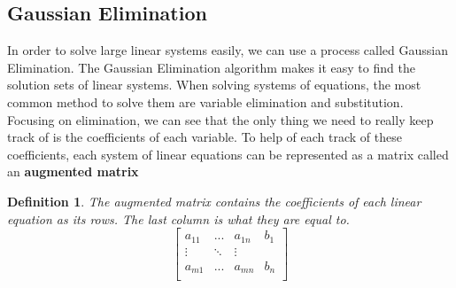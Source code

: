\documentclass{article}
\newtheorem{definition}{Definition}
\begin{document}
    \subsection{Gaussian Elimination}
    In order to solve large linear systems easily, we can use a process called Gaussian Elimination. The Gaussian Elimination algorithm makes it easy to find the solution sets of linear systems.
    When solving systems of equations, the most common method to solve them are variable elimination and substitution.
    Focusing on elimination, we can see that the only thing we need to really keep track of is the coefficients of each variable.
    To help of each track of these coefficients, each system of linear equations can be represented as a matrix called an \textbf{augmented matrix}
    \begin{definition}
        The augmented matrix contains the coefficients of each linear equation as its rows. The last column is what they are equal to.
        \[
            \left[
            \begin{array}{ccc|c}
            a_{11} & ... & a_{1n} & b_1 \\
            \vdots & \ddots & \vdots \\
            a_{m1} & ... & a_{mn} & b_n \\
            \end{array}
            \right]
        \]
    \end{definition}
\end{document}
